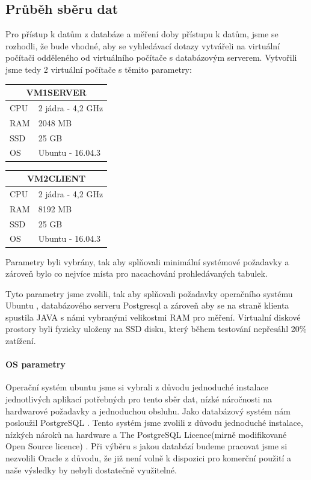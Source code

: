 \documentclass[a4paper, 11pt]{article}
\begin{document}
\subsection{Průběh sběru dat}
Pro přístup k datům z databáze a měření doby přístupu k datům, jsme se rozhodli, že bude vhodné, aby se vyhledávací dotazy vytvářeli na virtuální počítači odděleného od virtuálního počítače s databázovým serverem. Vytvořili jsme tedy 2 virtuální počítače s těmito parametry: 

\begin{center}
\begin{tabular}{ |l|l| }
  \hline
  \multicolumn{2}{|c|}{VM1SERVER} \\
  \hline
  CPU & 2 jádra - 4,2 GHz \\
  RAM & 2048 MB \\
  SSD & 25 GB\\
  OS & Ubuntu - 16.04.3\\
  \hline
\end{tabular}

\hspace{20 in}

\begin{tabular}{ |l|l| }
  \hline
  \multicolumn{2}{|c|}{VM2CLIENT} \\
  \hline
  CPU & 2 jádra - 4,2 GHz \\
  RAM & 8192 MB \\
  SSD & 25 GB\\
  OS & Ubuntu - 16.04.3\\
  \hline
\end{tabular}
\end{center}
Parametry byli vybrány, tak aby splňovali minimální systémové požadavky a zároveň bylo co nejvíce místa pro nacachování prohledávaných tabulek.


Tyto parametry jsme zvolili, tak aby splňovali požadavky operačního systému Ubuntu \cite{ubuntusysreq}, databázového serveru Postgresql \cite{postgresqlsysreq} a zároveň aby se na straně klienta spustila JAVA s námi vybranými velikostmi RAM pro měření.  Virtualní diskové prostory byli fyzicky uloženy na SSD disku, který během testování nepřesáhl 20\% zatížení. 
\paragraph{OS parametry} \label{sec:os}
Operační systém ubuntu \cite{ubuntu_web} jsme si vybrali z důvodu jednoduché instalace jednotlivých aplikací potřebných pro tento sběr dat, nízké náročnosti na hardwarové požadavky a jednoduchou obsluhu.
Jako databázový systém nám posloužil PostgreSQL \cite{postgresql_web}. Tento systém jsme zvolili z důvodu jednoduché instalace, nízkých nároků na hardware a The PostgreSQL Licence(mirně modifikované Open Source licence) \cite{postgresqllicence}. Při výběru s jakou databází budeme pracovat jsme si nezvolili Oracle \cite{oracle} z důvodu, že již není volně k dispozici pro komerční použití a naše výsledky by nebyli dostatečně využitelné. 
\end{document}
